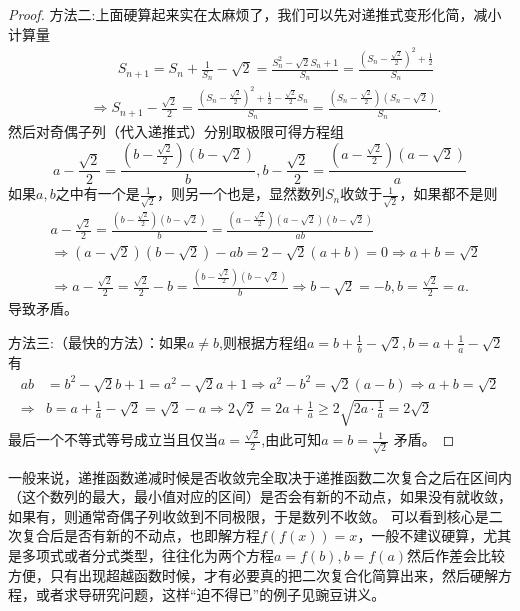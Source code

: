 \documentclass[../../main.tex]{subfiles}
\begin{document}
\begin{proof}
{\color{blue}方法二:}上面硬算起来实在太麻烦了，我们可以先对递推式变形化简，减小计算量
\begin{align*}
&\qquad S_{n+1}=S_n+\frac{1}{S_n}-\sqrt{2}=\frac{S_{n}^{2}-\sqrt{2}S_n+1}{S_n}=\frac{\left( S_n-\frac{\sqrt{2}}{2} \right) ^2+\frac{1}{2}}{S_n}
\\
&\Longrightarrow S_{n+1}-\frac{\sqrt{2}}{2}=\frac{\left( S_n-\frac{\sqrt{2}}{2} \right) ^2+\frac{1}{2}-\frac{\sqrt{2}}{2}S_n}{S_n}=\frac{\left( S_n-\frac{\sqrt{2}}{2} \right) (S_n-\sqrt{2})}{S_n}.
\end{align*}
然后对奇偶子列（代入递推式）分别取极限可得方程组
\[a-\frac{\sqrt{2}}{2}=\frac{\left(b-\frac{\sqrt{2}}{2}\right)(b - \sqrt{2})}{b},b-\frac{\sqrt{2}}{2}=\frac{\left(a-\frac{\sqrt{2}}{2}\right)(a - \sqrt{2})}{a}\]
如果\(a,b\)之中有一个是\(\frac{1}{\sqrt{2}}\)，则另一个也是，显然数列\(S_n\)收敛于\(\frac{1}{\sqrt{2}}\)，如果都不是则
\begin{align*}
&a-\frac{\sqrt{2}}{2}=\frac{\left( b-\frac{\sqrt{2}}{2} \right) (b-\sqrt{2})}{b}=\frac{\left( a-\frac{\sqrt{2}}{2} \right) (a-\sqrt{2})(b-\sqrt{2})}{ab}
\\
&\Rightarrow \left( a-\sqrt{2} \right) \left( b-\sqrt{2} \right) -ab=2-\sqrt{2}(a+b)=0\Rightarrow a+b=\sqrt{2}
\\
&\Rightarrow a-\frac{\sqrt{2}}{2}=\frac{\sqrt{2}}{2}-b=\frac{\left( b-\frac{\sqrt{2}}{2} \right) (b-\sqrt{2})}{b}\Rightarrow b-\sqrt{2}=-b,b=\frac{\sqrt{2}}{2}=a.
\end{align*}
导致矛盾。

{\color{blue}方法三:}（最快的方法）：如果\(a\neq b\),则根据方程组\(a = b+\frac{1}{b}-\sqrt{2},b = a+\frac{1}{a}-\sqrt{2}\)有
\begin{align*}
ab&=b^2-\sqrt{2}b+1=a^2-\sqrt{2}a+1\Rightarrow a^2-b^2=\sqrt{2}\left( a-b \right) \Rightarrow a+b=\sqrt{2}\\
\Rightarrow &b=a+\frac{1}{a}-\sqrt{2}=\sqrt{2}-a\Rightarrow 2\sqrt{2}=2a+\frac{1}{a}\geqslant 2\sqrt{2a\cdot\frac{1}{a}}=2\sqrt{2}
\end{align*}
最后一个不等式等号成立当且仅当$a=\frac{\sqrt{2}}{2}$,由此可知\(a = b=\frac{1}{\sqrt{2}}\) 矛盾。

\end{proof}
\begin{remark}
一般来说，递推函数递减时候是否收敛完全取决于递推函数二次复合之后在区间内（这个数列的最大，最小值对应的区间）是否会有新的不动点，如果没有就收敛，如果有，则通常奇偶子列收敛到不同极限，于是数列不收敛。
可以看到核心是二次复合后是否有新的不动点，也即解方程\(f(f(x)) = x\)，一般不建议硬算，尤其是多项式或者分式类型，往往化为两个方程\(a = f(b),b = f(a)\)然后作差会比较方便，只有出现超越函数时候，才有必要真的把二次复合化简算出来，然后硬解方程，或者求导研究问题，这样“迫不得已”的例子见豌豆讲义。
\end{remark}
\end{document}

